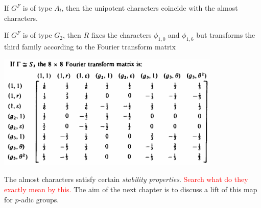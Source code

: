 \begin{example}
    If $G^F$ is of type $A_l$, then the unipotent characters coincide with the almost characters.

    If $G^F$ is of type $G_2$, then $R$ fixes the characters $\phi_{1,0}$ and $\phi_{1,6}$ but transforms the third family according to the Fourier transform matrix
    \begin{center}
        \includegraphics[width=0.8\textwidth]{Fourier matrix for S_3.png}
    \end{center}
\end{example}

The almost characters satisfy certain \textit{stability properties}. \textcolor{red}{Search what do they exactly mean by this.}
The aim of the next chapter is to discuss a lift of this map for $p$-adic groups.